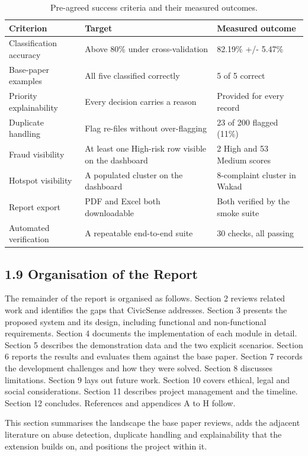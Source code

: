 \documentclass[10pt,letterpaper,oneside]{article}\usepackage{geometry}\geometry{top=1in,bottom=1in,left=1in,right=1in,includeheadfoot}\usepackage{xcolor}\definecolor{color@navy}{HTML}{1F3B63}\definecolor{color@grey}{HTML}{404040}\definecolor{color@hdr}{HTML}{F2F4F7}\usepackage{titlesec}\titleformat{\section}  {\normalfont\huge\bfseries\color@navy}  {}{0pt}{\MakeUppercase}\titleformat{\subsection}  {\normalfont\Large\bfseries\color@navy}  {}{0pt}{}\titleformat{\subsubsection}  {\normalfont\large\bfseries\color@navy}  {}{0pt}{}\titlespacing*{\section}{0pt}{14pt}{6pt}\titlespacing*{\subsection}{0pt}{10pt}{4pt}\titlespacing*{\subsubsection}{0pt}{8pt}{3pt}\setlength{\parindent}{0pt}\setlength{\parskip}{0.6em}\parindent=0pt\usepackage{enumitem}\setlist{nosep,leftmargin=*,itemsep=0pt,topsep=2pt,partopsep=0pt}\usepackage{array}\usepackage{booktabs}\usepackage{caption}\captionsetup{font={small,it},labelfont={bf},labelsep=period,  parskip=2pt,skip=4pt,list=no}\captionsetup[table]{labelfont={bf,small,color@navy},name=Table}\usepackage{graphicx}\usepackage{verbatim}\usepackage{ragged2e}\usepackage{longtable}\usepackage{tabularx}\usepackage{multirow}\usepackage{colortbl}\definecolor{rowshade}{HTML}{F2F4F7}\usepackage{tikz}\usetikzlibrary{positioning,calc}\usepackage[hidelinks]{hyperref}\hypersetup{colorlinks=true,linkcolor=color@navy,urlcolor=color@navy}\pagestyle{fancy}\fancyhf{}\renewcommand{\headrulewidth}{0.4pt}\fancyhead[L]{\small\color@navy CivicSense — Project Report}\fancyhead[R]{\small\color@grey October 11, 2026}\fancyfoot[C]{\small\color@grey An Integrated Intelligent Triage Pipelin}\fancyfoot[R]{\small\color@grey Page \thepage}\usepackage{setspace}\setstretch{1.15}\AtBeginDocument{  \hypersetup{pdftitle={An Integrated Intelligent Triage Pipeline for AI-Enhanced Citizen Complaint Management},    pdfauthor={CivicSense Project Team},    pdfsubject={Project Report},    pdfkeywords={smart cities, NLP, complaint management, e-governance},    pdfcreator={CivicSense Project Team}  }}
\begin{document}
\begin{table}[htbp]
\centering
\small
\begin{tabular}{@{}lll@{}}
\toprule
Criterion & Target & Measured outcome \\
\midrule
Classification accuracy & Above 80\% under cross-validation & 82.19\% +/- 5.47\% \\
Base-paper examples & All five classified correctly & 5 of 5 correct \\
Priority explainability & Every decision carries a reason & Provided for every record \\
Duplicate handling & Flag re-files without over-flagging & 23 of 200 flagged (11\%) \\
Fraud visibility & At least one High-risk row visible on the dashboard & 2 High and 53 Medium scores \\
Hotspot visibility & A populated cluster on the dashboard & 8-complaint cluster in Wakad \\
Report export & PDF and Excel both downloadable & Both verified by the smoke suite \\
Automated verification & A repeatable end-to-end suite & 30 checks, all passing \\
\bottomrule
\end{tabular}
\caption{Pre-agreed success criteria and their measured outcomes.}
\end{table}

\subsection*{1.9 Organisation of the Report}
The remainder of the report is organised as follows. Section 2 reviews related work and identifies the gaps that CivicSense addresses. Section 3 presents the proposed system and its design, including functional and non-functional requirements. Section 4 documents the implementation of each module in detail. Section 5 describes the demonstration data and the two explicit scenarios. Section 6 reports the results and evaluates them against the base paper. Section 7 records the development challenges and how they were solved. Section 8 discusses limitations. Section 9 lays out future work. Section 10 covers ethical, legal and social considerations. Section 11 describes project management and the timeline. Section 12 concludes. References and appendices A to H follow.

\clearpage
{}

This section summarises the landscape the base paper reviews, adds the adjacent literature on abuse detection, duplicate handling and explainability that the extension builds on, and positions the project within it.
\end{document}
